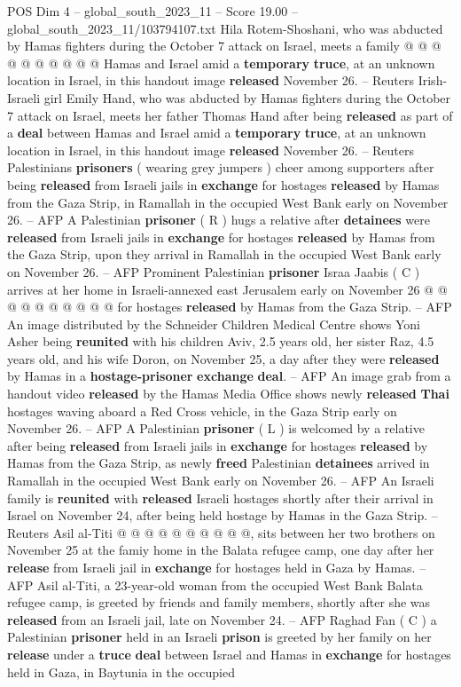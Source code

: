 \begin{textsample}{POS Dim 4 – global\_south\_2023\_11 – Score 19.00 – global\_south\_2023\_11/103794107.txt}
Hila Rotem-Shoshani, who was abducted by Hamas fighters during the October 7 attack on Israel, meets a family @ @ @ @ @ @ @ @ @ @ Hamas and Israel amid a \textbf{temporary} \textbf{truce}, at an unknown location in Israel, in this handout image \textbf{released} November 26. -- Reuters Irish-Israeli girl Emily Hand, who was abducted by Hamas fighters during the October 7 attack on Israel, meets her father Thomas Hand after being \textbf{released} as part of a \textbf{deal} between Hamas and Israel amid a \textbf{temporary} \textbf{truce}, at an unknown location in Israel, in this handout image \textbf{released} November 26. -- Reuters Palestinians \textbf{prisoners} ( wearing grey jumpers ) cheer among supporters after being \textbf{released} from Israeli jails in \textbf{exchange} for hostages \textbf{released} by Hamas from the Gaza Strip, in Ramallah in the occupied West Bank early on November 26. -- AFP A Palestinian \textbf{prisoner} ( R ) hugs a relative after \textbf{detainees} were \textbf{released} from Israeli jails in \textbf{exchange} for hostages \textbf{released} by Hamas from the Gaza Strip, upon they arrival in Ramallah in the occupied West Bank early on November 26. -- AFP Prominent Palestinian \textbf{prisoner} Israa Jaabis ( C ) arrives at her home in Israeli-annexed east Jerusalem early on November 26 @ @ @ @ @ @ @ @ @ @ for hostages \textbf{released} by Hamas from the Gaza Strip. -- AFP An image distributed by the Schneider Children Medical Centre shows Yoni Asher being \textbf{reunited} with his children Aviv, 2.5 years old, her sister Raz, 4.5 years old, and his wife Doron, on November 25, a day after they were \textbf{released} by Hamas in a \textbf{hostage-prisoner} \textbf{exchange} \textbf{deal}. -- AFP An image grab from a handout video \textbf{released} by the Hamas Media Office shows newly \textbf{released} \textbf{Thai} hostages waving aboard a Red Cross vehicle, in the Gaza Strip early on November 26. -- AFP A Palestinian \textbf{prisoner} ( L ) is welcomed by a relative after being \textbf{released} from Israeli jails in \textbf{exchange} for hostages \textbf{released} by Hamas from the Gaza Strip, as newly \textbf{freed} Palestinian \textbf{detainees} arrived in Ramallah in the occupied West Bank early on November 26. -- AFP An Israeli family is \textbf{reunited} with \textbf{released} Israeli hostages shortly after their arrival in Israel on November 24, after being held hostage by Hamas in the Gaza Strip. -- Reuters Asil al-Titi @ @ @ @ @ @ @ @ @ @, sits between her two brothers on November 25 at the famiy home in the Balata refugee camp, one day after her \textbf{release} from Israeli jail in \textbf{exchange} for hostages held in Gaza by Hamas. -- AFP Asil al-Titi, a 23-year-old woman from the occupied West Bank Balata refugee camp, is greeted by friends and family members, shortly after she was \textbf{released} from an Israeli jail, late on November 24. -- AFP Raghad Fan ( C ) a Palestinian \textbf{prisoner} held in an Israeli \textbf{prison} is greeted by her family on her \textbf{release} under a \textbf{truce} \textbf{deal} between Israel and Hamas in \textbf{exchange} for hostages held in Gaza, in Baytunia in the occupied 
\end{textsample}
